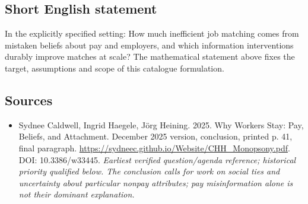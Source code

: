 \documentclass[11pt]{article}
\begin{document}
\subsection{Short English statement}
In the explicitly specified setting: How much inefficient job matching comes from mistaken beliefs about pay and employers, and which information interventions durably improve matches at scale? The mathematical statement above fixes the target, assumptions and scope of this catalogue formulation.

\subsection{Sources}
\begin{itemize}\raggedright
\item[\textnormal{[S1]}]\hypertarget{source:30007634:1}{} Sydnee Caldwell, Ingrid Haegele, Jörg Heining. 2025. Why Workers Stay: Pay, Beliefs, and Attachment. December 2025 version, conclusion, printed p. 41, final paragraph.
\url{https://sydneec.github.io/Website/CHH_Monopsony.pdf}.
DOI: 10.3386/w33445.
{\small\textit{Earliest verified question/agenda reference; historical priority qualified below. The conclusion calls for work on social ties and uncertainty about particular nonpay attributes; pay misinformation alone is not their dominant explanation.}}
\end{itemize}
\end{document}
